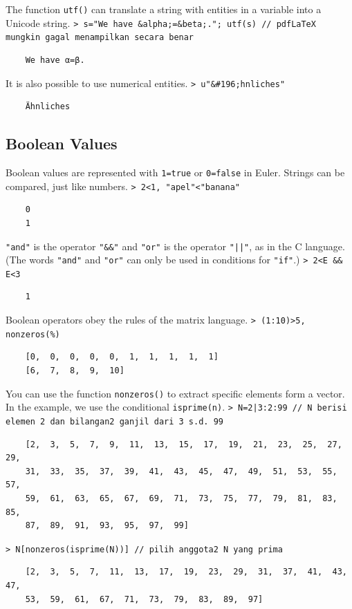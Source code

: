 \documentclass[11pt, a4paper]{article}
\newcommand{\emtcmd}[1]{\noindent\texttt{\textcolor{emtcommand}{>}\ #1}\par\smallskip}
\begin{document}
The function \texttt{utf()} can translate a string with entities in a variable into a Unicode string.
\emtcmd{s="We have \&alpha;=\&beta;."; utf(s) \textcolor{emtcomment}{// pdfLaTeX mungkin gagal menampilkan secara benar}}
\begin{verbatim}
    We have α=β.
\end{verbatim}

It is also possible to use numerical entities.
\emtcmd{u"\&\#196;hnliches"}
\begin{verbatim}
    Ähnliches
\end{verbatim}

\subsection*{Boolean Values}

Boolean values are represented with \texttt{1=true} or \texttt{0=false} in Euler. Strings can be compared, just like numbers.
\emtcmd{2<1, "apel"<"banana"}
\begin{verbatim}
    0
    1
\end{verbatim}

\texttt{"and"} is the operator \texttt{"\&\&"} and \texttt{"or"} is the operator \texttt{"||"}, as in the C language. (The words \texttt{"and"} and \texttt{"or"} can only be used in conditions for \texttt{"if"}.)
\emtcmd{2<E \&\& E<3}
\begin{verbatim}
    1
\end{verbatim}

Boolean operators obey the rules of the matrix language.
\emtcmd{(1:10)>5, nonzeros(\%)}
\begin{verbatim}
    [0,  0,  0,  0,  0,  1,  1,  1,  1,  1]
    [6,  7,  8,  9,  10]
\end{verbatim}

You can use the function \texttt{nonzeros()} to extract specific elements form a vector. In the example, we use the conditional \texttt{isprime(n)}.
\emtcmd{N=2|3:2:99 \textcolor{emtcomment}{// N berisi elemen 2 dan bilangan2 ganjil dari 3 s.d. 99}}
\begin{verbatim}
    [2,  3,  5,  7,  9,  11,  13,  15,  17,  19,  21,  23,  25,  27,  29,
    31,  33,  35,  37,  39,  41,  43,  45,  47,  49,  51,  53,  55,  57,
    59,  61,  63,  65,  67,  69,  71,  73,  75,  77,  79,  81,  83,  85,
    87,  89,  91,  93,  95,  97,  99]
\end{verbatim}
\emtcmd{N[nonzeros(isprime(N))] \textcolor{emtcomment}{// pilih anggota2 N yang prima}}
\begin{verbatim}
    [2,  3,  5,  7,  11,  13,  17,  19,  23,  29,  31,  37,  41,  43,  47,
    53,  59,  61,  67,  71,  73,  79,  83,  89,  97]
\end{verbatim}
\end{document}
